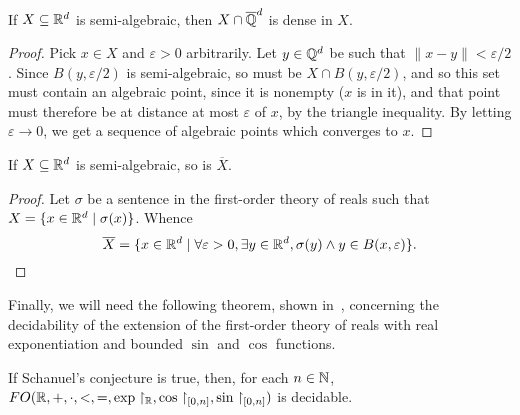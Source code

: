 \begin{lemma}
\label{lem:semi-alg-density}
If $X\subseteq\mathbb{R}^{d}$ is semi-algebraic, then $X\cap\overline{\mathbb{Q}}^{d}$ is dense in $X$.
\end{lemma}

\begin{proof}
  Pick $x\in X$ and $\varepsilon>0$ arbitrarily. Let
  $y\in\mathbb{Q}^{d}$ be such that $\| x-y \|<\varepsilon/2$. Since
  $B(y,\varepsilon/2)$ is semi-algebraic, so must be $X\cap
  B(y,\varepsilon/2)$, and so this set must contain an algebraic
  point, since it is nonempty ($x$ is in it), and that point must
  therefore be at distance at most $\varepsilon$ of $x$, by the
  triangle inequality. By letting $\varepsilon\rightarrow 0$, we get
  a sequence of algebraic points which converges to $x$.
\end{proof}

\begin{lemma}
\label{lem:semi-alg-closure}
If $X\subseteq\mathbb{R}^{d}$ is semi-algebraic, so is $\overline{X}$.
\end{lemma}

\begin{proof}
  Let $\sigma$ be a sentence in the first-order theory of reals such
  that $X=\lbrace x\in\mathbb{R}^{d}\mid \sigma(x)\rbrace$. Whence
\begin{equation*}
  \overline{X}=\lbrace x\in\mathbb{R}^{d}\mid
\forall \varepsilon>0,\exists y\in\mathbb{R}^{d},\sigma(y)\wedge y\in B(x,\varepsilon) \rbrace .
\end{equation*}
\end{proof}

Finally, we will need the following theorem, shown in~\cite{WM}, concerning the decidability of the extension of the first-order theory of reals with real exponentiation and bounded $\sin$ and $\cos$ functions.
\begin{theorem}
\label{thm:wilkie-macintyre}
  If Schanuel's conjecture is true, then, for each $n \in \mathbb{N}$,
  $FO(\mathbb{R}, +, \cdot, <, =, \exp \restriction_{\mathbb{R}}, \cos\restriction_{[0, n]}, \sin\restriction_{[0,n]})$ is decidable.
\end{theorem}
